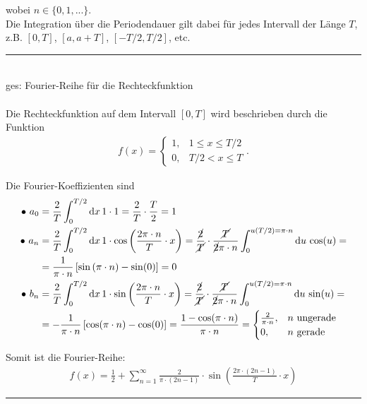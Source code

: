 \documentclass{article}
\newcommand{\diff}{\mathrm{d}}
\newcommand{\lr}[1]{\left(#1\right)}
\newcommand{\lreck}[1]{\left[#1\right]}
\begin{document}
wobei $n \in \{0, 1, ...\}$.\\
Die Integration über die Periodendauer gilt dabei für jedes Intervall der Länge $T$, z.B. $[0,T]$, $[a,a+T]$, $[-T/2,T/2]$, etc.

\vspace{0.5cm}

{\color{blue}
\hrule
	\\
	ges: Fourier-Reihe für die Rechteckfunktion\\
	\\
	Die Rechteckfunktion auf dem Intervall $[0,T]$ wird beschrieben durch die Funktion
		\begin{align*}
			f(x) =
			\begin{cases}
				1, & 1 \leq x \leq T/2 \\
				0, & T/2 < x \leq T
			\end{cases}.
		\end{align*}

	Die Fourier-Koeffizienten sind
		\begin{align*}
			\bullet \ a_0 &= \frac{2}{T} \int_0^{T/2} \diff x \, 1 \cdot 1 = \frac{2}{T} \cdot \frac{T}{2} = 1 \\
			\bullet \ a_n &= \frac{2}{T} \int_0^{T/2} \diff x \, 1 \cdot \cos \lr{ \frac{2\pi \cdot n}{T} \cdot x } = \frac{\cancel{2}}{\cancel{T}} \cdot \frac{\cancel{T}}{\cancel{2}\pi \cdot n} \int_0^{u(T/2) = \pi \cdot n} \diff u \, \cos(u) = \\
			&= \frac{1}{\pi \cdot n} \lreck{ \sin \lr{ \pi \cdot n } - \sin(0) } = 0 \\
			\bullet \ b_n &= \frac{2}{T} \int_0^{T/2} \diff x \, 1 \cdot \sin \lr{ \frac{2\pi \cdot n}{T} \cdot x } = \frac{\cancel{2}}{\cancel{T}} \cdot \frac{\cancel{T}}{\cancel{2}\pi \cdot n} \int_0^{u(T/2) = \pi \cdot n} \diff u \, \sin(u) = \\
			&= -\frac{1}{\pi \cdot n} \lreck{ \cos (\pi \cdot n) - \cos(0) } = \frac{ 1 - \cos(\pi \cdot n) }{ \pi \cdot n } =
			\begin{cases}
				\frac{2}{\pi \cdot n}, & \text{$n$ ungerade} \\
				0, & \text{$n$ gerade}
			\end{cases}
		\end{align*}
	
	Somit ist die Fourier-Reihe:
		\begin{align*}
			f(x) = \frac{1}{2} + \sum_{n=1}^\infty \frac{2}{\pi \cdot (2n-1)} \cdot \sin \lr{ \frac{2\pi \cdot (2n-1) }{T} \cdot x }
		\end{align*}
\hrule
}
\end{document}
